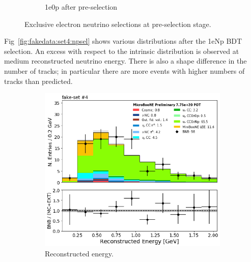 \begin{figure}[H]
\begin{center}
\begin{subfigure}[b]{0.45\textwidth}
    \caption{\label{fig:fakedata:set4:2shr0p} 1e0p after pre-selection}
    \end{subfigure}
\caption{\label{fig:fakedata:set4:presel} Exclusive electron neutrino selections at pre-selection stage.}
\end{center}
\end{figure}

Fig~\ref{fig:fakedata:set4:npsel} shows various distributions after the 1eNp BDT selection.  An excess with respect to the \nue intrinsic distribution is observed at medium reconstructed neutrino energy. There is also a shape difference in the number of tracks; in particular there are more events with higher numbers of tracks than predicted. 

\begin{figure}[H] 
\begin{center}
    \begin{subfigure}[b]{0.45\textwidth}
    \centering
    \includegraphics[width=1.00\textwidth]{Fakedata/set4/Np_postsel_recoe.pdf}
    \caption{\label{fig:fakedata:set4:Np_postsel_recoe} Reconstructed energy.}
    \end{subfigure}
    \begin{subfigure}[b]{0.45\textwidth}
    \centering

\end{subfigure}
\end{center}
\end{figure}
